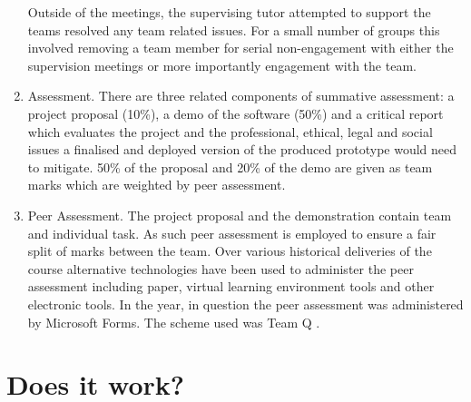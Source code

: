 \documentclass[sigconf, anonymous=true]{acmart}
\begin{document}
\begin{enumerate}
Outside of the meetings, the supervising tutor attempted to support the teams resolved any team related issues. For a small number of groups this involved removing a team member for serial non-engagement with either the supervision meetings or more importantly engagement with the team.
\item{Assessment.}
There are three related components of summative assessment: a project proposal (10\%), a demo of the software (50\%) and a critical report which evaluates the project and the professional, ethical, legal and social issues a finalised and deployed version of the produced prototype would need to mitigate. 50\% of the proposal and 20\% of the demo are given as team marks which are weighted by peer assessment.
\item{Peer Assessment.}
The project proposal and the demonstration contain team and individual task. As such peer assessment is employed to ensure a fair split of marks between the team. Over various historical deliveries of the course alternative technologies have been used to administer the peer assessment including paper, virtual learning environment tools and other electronic tools. In the year, in question the peer assessment was administered by Microsoft Forms. The scheme used was Team Q \cite{Britton2017}.
\end{enumerate}

\section{Does it work?}	
\end{document}
